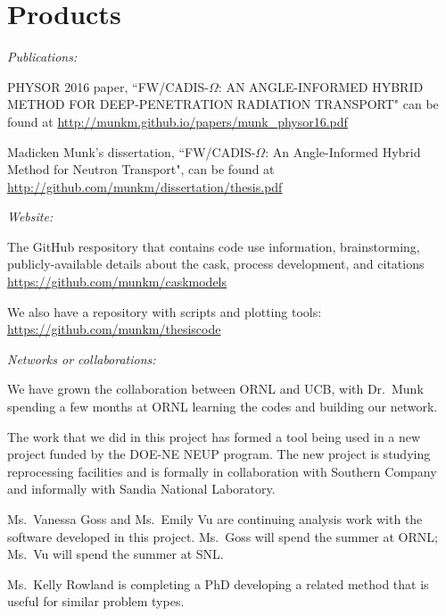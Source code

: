 \documentclass[12pt]{article}
\begin{document}
\section{Products}
\label{sect::products}
\textit{Publications:} 
\begin{compactitem}
\item PHYSOR 2016 paper, ``FW/CADIS-$\Omega$: AN ANGLE-INFORMED HYBRID METHOD FOR DEEP-PENETRATION RADIATION TRANSPORT" can be found at \url{http://munkm.github.io/papers/munk\_physor16.pdf}

\item Madicken Munk's dissertation, ``FW/CADIS-$\Omega$: An Angle-Informed Hybrid Method for Neutron Transport", can be found at \url{http://github.com/munkm/dissertation/thesis.pdf} \cite{Munk2017}
\end{compactitem}

\textit{Website:} 
\begin{compactitem}
\item The GitHub respository that contains code use information, brainstorming, publicly-available details about the cask, process development, and citations \url{https://github.com/munkm/caskmodels}

\item We also have a repository with scripts and plotting tools: \url{https://github.com/munkm/thesiscode}
\end{compactitem}

\textit{Networks or collaborations:} 
\begin{compactitem}
\item We have grown the collaboration between ORNL and UCB, with Dr.\ Munk spending a few months at ORNL learning the codes and building our network. 

\item The work that we did in this project has formed a tool being used in a new project funded by the DOE-NE NEUP program.  The new project is studying reprocessing facilities and is formally in collaboration with Southern Company and informally with Sandia National Laboratory. 

\item Ms.\ Vanessa Goss and Ms.\ Emily Vu are continuing analysis work with the software developed in this project. Ms.\ Goss will spend the summer at ORNL; Ms.\ Vu will spend the summer at SNL.

\item Ms.\ Kelly Rowland is completing a PhD developing a related method that is useful for similar problem types. 
\end{compactitem}
\end{document}
